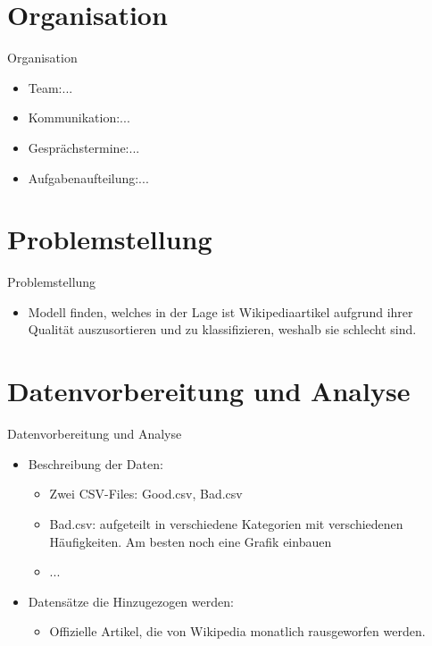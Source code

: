 \documentclass[aspectratio=169]{beamer} %
\begin{document}

\section{Organisation}
\begin{frame}
  Organisation
  \begin{itemize}
    \item Team:...
    \item Kommunikation:...
    \item Gespr\"achstermine:...
    \item Aufgabenaufteilung:...
  \end{itemize}
\end{frame}

\section{Problemstellung}
\begin{frame}
  Problemstellung
  \begin{itemize}
    \item Modell finden, welches in der Lage ist Wikipediaartikel aufgrund ihrer Qualit\"at auszusortieren und zu klassifizieren, weshalb sie schlecht sind.
  \end{itemize}
\end{frame}

\section{Datenvorbereitung und Analyse}
\begin{frame}
  Datenvorbereitung und Analyse
  \begin{itemize}
    \item Beschreibung der Daten:
          \begin{itemize}
            \item Zwei CSV-Files: Good.csv, Bad.csv
            \item Bad.csv: aufgeteilt in verschiedene Kategorien mit verschiedenen H\"aufigkeiten. Am besten noch eine Grafik einbauen
            \item ...
          \end{itemize}
    \item Datens\"atze die Hinzugezogen werden:
          \begin{itemize}
            \item  Offizielle Artikel, die von Wikipedia monatlich rausgeworfen werden.
          \end{itemize}
  \end{itemize}
\end{frame}
\end{document}
